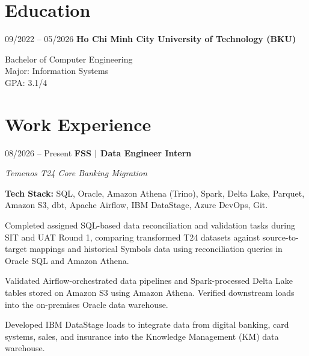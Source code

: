     \section{Education}
    \begin{twocolentry}{09/2022 -- 05/2026}
        \textbf{Ho Chi Minh City  University of Technology (BKU)}
    \end{twocolentry}
    \vspace{0.1cm}
    \begin{onecolentry}
        \textbf {}Bachelor of Computer Engineering\\
        \textbf {}Major: Information Systems\\
        \textbf{}GPA: 3.1/4
    \end{onecolentry}
    \section{Work Experience}

    \begin{twocolentry}{08/2026 -- Present}
        \textbf{FSS | Data Engineer Intern}
    \end{twocolentry}
    \vspace{0.1cm}
    \begin{onecolentry}
        \textit{Temenos T24 Core Banking Migration}
        \par\vspace{0.1cm}
        \textbf{Tech Stack:} SQL, Oracle, Amazon Athena (Trino), Spark, Delta Lake, Parquet, Amazon S3, dbt, Apache Airflow, IBM DataStage, Azure DevOps, Git.
        \begin{highlights}
            \item Completed assigned SQL-based data reconciliation and validation tasks during SIT and UAT Round 1, comparing transformed T24 datasets against source-to-target mappings and historical Symbols data using reconciliation queries in Oracle SQL and Amazon Athena.
            \item Validated Airflow-orchestrated data pipelines and Spark-processed Delta Lake tables stored on Amazon S3 using Amazon Athena. Verified downstream loads into the on-premises Oracle data warehouse.
            \item Developed IBM DataStage loads to integrate data from digital banking, card systems, sales, and insurance into the Knowledge Management (KM) data warehouse.
        \end{highlights}
    \end{onecolentry}
    \vspace{0.1cm}

